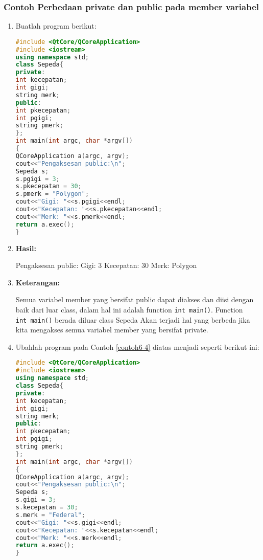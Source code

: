 \subsubsection*{Contoh  Perbedaan private dan public pada member variabel}
\begin{enumerate}
	

	\item Buatlah program berikut:
	
\begin{lstlisting}[language=c++, caption=Public pada member variabel, label=contoh6-4]
#include <QtCore/QCoreApplication>
#include <iostream>
using namespace std;
class Sepeda{
private:
int kecepatan;
int gigi;
string merk;
public:
int pkecepatan;
int pgigi;
string pmerk;
};
int main(int argc, char *argv[])
{
QCoreApplication a(argc, argv);
cout<<"Pengaksesan public:\n";
Sepeda s;
s.pgigi = 3;
s.pkecepatan = 30;
s.pmerk = "Polygon";
cout<<"Gigi: "<<s.pgigi<<endl;
cout<<"Kecepatan: "<<s.pkecepatan<<endl;
cout<<"Merk: "<<s.pmerk<<endl;
return a.exec();
}
\end{lstlisting}
	
\item 	\textbf{Hasil:}
	
	\begin{lcverbatim}
Pengaksesan public:
Gigi: 3
Kecepatan: 30
Merk: Polygon
	\end{lcverbatim}
	
\item 	\textbf{Keterangan:}
	
	Semua variabel member yang bersifat public dapat diakses dan diisi
	dengan baik dari luar class, dalam hal ini adalah function
	\texttt{int\ main()}. Function \texttt{int\ main()} berada diluar class
	Sepeda Akan terjadi hal yang berbeda jika kita mengakses semua variabel
	member yang bersifat private.
	
\item 	Ubahlah program pada Contoh \ref{contoh6-4} diatas menjadi seperti berikut ini:
	
\begin{lstlisting}[language=c++, caption=Privat pada member variabel, label=contoh6-5]
#include <QtCore/QCoreApplication>
#include <iostream>
using namespace std;
class Sepeda{
private:
int kecepatan;
int gigi;
string merk;
public:
int pkecepatan;
int pgigi;
string pmerk;
};
int main(int argc, char *argv[])
{
QCoreApplication a(argc, argv);
cout<<"Pengaksesan public:\n";
Sepeda s;
s.gigi = 3;
s.kecepatan = 30;
s.merk = "Federal";
cout<<"Gigi: "<<s.gigi<<endl;
cout<<"Kecepatan: "<<s.kecepatan<<endl;
cout<<"Merk: "<<s.merk<<endl;
return a.exec();
}
\end{lstlisting}
	

\end{enumerate}
